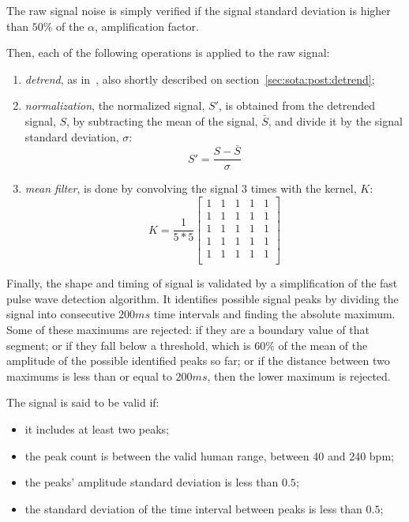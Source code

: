 The raw signal noise is simply verified if the signal standard deviation
is higher than $50\%$ of the $\alpha$, amplification factor.

Then, each of the following operations is applied to the raw signal:
\begin{enumerate}
  \item \emph{detrend}, as in~\cite{Tarvainen2002Advanced}, also shortly
        described on section~\ref{sec:sota:post:detrend};
  \item \emph{normalization}, the normalized signal, $S'$, is obtained from
        the detrended signal, $S$, by subtracting the mean of the signal,
        $\bar{S}$, and divide it by the signal standard deviation, $\sigma$:
        \begin{equation}
          S' = \frac{S - \bar{S}}{\sigma}
        \end{equation}
  \item \emph{mean filter}, is done by convolving the signal $3$ times with
        the kernel, $K$:
        \begin{equation}
          K = \frac{1}{5 * 5}
          \begin{bmatrix}
             1 & 1 & 1 & 1 & 1 \\
             1 & 1 & 1 & 1 & 1 \\
             1 & 1 & 1 & 1 & 1 \\
             1 & 1 & 1 & 1 & 1 \\
             1 & 1 & 1 & 1 & 1 \\
          \end{bmatrix}
        \end{equation}
\end{enumerate}

Finally, the shape and timing of signal is validated by a simplification of
the fast pulse wave detection algorithm\cite{Nenova2010Automated}.
It identifies possible signal peaks by dividing the signal into consecutive
$200 ms$ time intervals and finding the absolute maximum. Some of these maximums
are rejected: if they are a boundary value of that segment; or if they fall
below a threshold, which is $60\%$ of the mean of the amplitude of the possible
identified peaks so far; or if the distance between two maximums is less than
or equal to $200 ms$, then the lower maximum is rejected.

The signal is said to be valid if:
\begin{itemize}
  \item it includes at least two peaks;
  \item the peak count is between the valid human range, between 40 and 240 bpm;
  \item the peaks' amplitude standard deviation is less than $0.5$;
  \item the standard deviation of the time interval between peaks is less
        than $0.5$;
\end{itemize}

